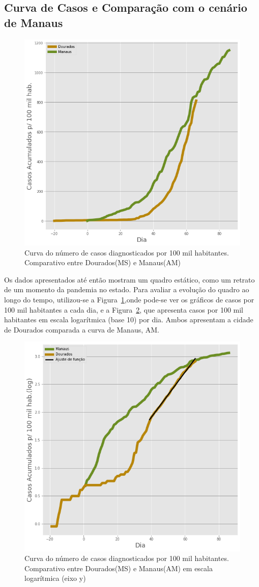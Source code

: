 \documentclass[12pt]{article}
\begin{document}
\subsection{Curva de Casos e Comparação com o cenário de Manaus}\label{ssec:curvaMAU}

\begin{figure}[!htb]
  \centering
  \includegraphics[width=.6\textwidth]{figs/Dourados_Manaus_casos.png}
  \caption{Curva do número de casos diagnosticados por 100 mil habitantes. Comparativo entre Dourados(MS) e Manaus(AM)}
  \label{fig:curva100K}
  \end{figure}

Os dados apresentados até então mostram um quadro estático, como um retrato de um momento da pandemia no estado. Para avaliar a evolução do quadro ao longo do tempo, utilizou-se a Figura~\ref{fig:curva100K},onde pode-se ver os gráficos de casos por 100 mil habitantes a cada dia, e a Figura~\ref{fig:curva100KLog}, que apresenta casos por 100 mil habitantes em escala logarítmica (base 10) por dia. Ambos apresentam a cidade de Dourados comparada a curva de Manaus, AM.

\begin{figure}[!htb]
  \centering
  \includegraphics[width=.6\textwidth]{figs/Dourados_Manaus_casos_log.png}
  \caption{Curva do número de casos diagnosticados por 100 mil habitantes. Comparativo entre Dourados(MS) e Manaus(AM) em escala logarítmica (eixo y)}
  \label{fig:curva100KLog}
  \end{figure}
\end{document}
